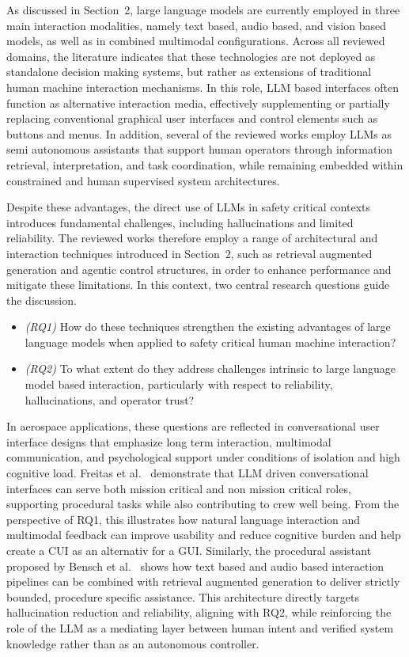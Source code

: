 As discussed in Section~2, large language models are currently employed in three main interaction modalities, namely text based, audio based, and vision based models, as well as in combined multimodal configurations. 
Across all reviewed domains, the literature indicates that these technologies are not deployed as standalone decision making systems, but rather as extensions of traditional human machine interaction mechanisms. 
In this role, LLM based interfaces often function as alternative interaction media, effectively supplementing or partially replacing conventional graphical user interfaces and control elements such as buttons and menus. 
In addition, several of the reviewed works employ LLMs as semi autonomous assistants that support human operators through information retrieval, interpretation, and task coordination, while remaining embedded within constrained and human supervised system architectures.

Despite these advantages, the direct use of LLMs in safety critical contexts introduces fundamental challenges, including hallucinations and limited reliability. 
The reviewed works therefore employ a range of architectural and interaction techniques introduced in Section~2, such as retrieval augmented generation and agentic control structures, in order to enhance performance and mitigate these limitations. 
In this context, two central research questions guide the discussion.

\begin{itemize}
    \item \emph{(RQ1)} How do these techniques strengthen the existing 
    advantages of large language models when applied to safety critical 
    human machine interaction?
    \item \emph{(RQ2)} To what extent do they address challenges intrinsic
     to large language model based interaction, particularly with respect to 
     reliability, hallucinations, and operator trust?
\end{itemize}
    

In aerospace applications, these questions are reflected in conversational 
user interface designs that emphasize long term interaction, multimodal 
communication, and psychological support under conditions of isolation and 
high cognitive load. 
Freitas et al.~\cite{freitas2021conversational} demonstrate that LLM driven conversational interfaces can serve both mission critical and non mission critical roles, supporting procedural tasks while also contributing to crew well being. 
From the perspective of RQ1, this illustrates how natural language interaction and multimodal feedback can improve usability and reduce cognitive burden and help create a CUI as an alternativ for a GUI.  
Similarly, the procedural assistant proposed by Bensch et al.~\cite{bensch2024aiassistants} shows how text based and audio based interaction pipelines can be combined with retrieval augmented generation to deliver strictly bounded, procedure specific assistance. 
This architecture directly targets hallucination reduction and reliability, aligning with RQ2, while reinforcing the role of the LLM as a mediating layer between human intent and verified system knowledge rather than as an autonomous controller.

